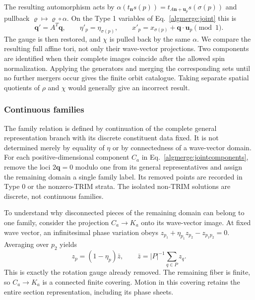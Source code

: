 The resulting automorphism acts by
$\alpha(t_{\bm n}s(p))=t_{A\bm n+\bm u_p}s(\sigma(p))$ and
pullback $\varrho\mapsto\varrho\circ\alpha$. On the Type 1
variables of Eq.~\eqref{algmerge:joint} this is
\begin{equation}
 \bm q'=A^T\bm q,\qquad
 \eta'_p=\eta_{\sigma(p)},\qquad
 x'_p=x_{\sigma(p)}+\bm q\cdot\bm u_p\pmod1.
 \tag{38e}\label{algmerge:pullback}
\end{equation}
The gauge is then restored, and $\chi$ is pulled back by the
same $\alpha$. We compare the resulting full affine tori,
not only their wave-vector projections. Two components are
identified when their complete images coincide after the
allowed spin normalization. Applying the generators and merging
the corresponding sets until no further mergers occur gives
the finite orbit catalogue. Taking separate spatial quotients
of $\rho$ and $\chi$ would generally give an incorrect result.

\subsubsection{Continuous families}
\label{algmerge:continuous}

The family relation is defined by continuation of the complete
general representation branch with its discrete constituent
data fixed. It is not determined merely by equality of $\eta$
or by connectedness of a wave-vector domain. For each
positive-dimensional component $C_a$ in
Eq.~\eqref{algmerge:jointcomponents}, remove the loci
$2\bm q=0$ modulo one from its general representatives and
assign the remaining domain a single family label. Its removed
points are recorded in Type 0 or the nonzero-TRIM strata.
The isolated non-TRIM solutions are discrete, not continuous
families.

To understand why disconnected pieces of the remaining domain
can belong to one family, consider the projection
$C_a\to K_a$ onto its wave-vector image. At fixed wave vector,
an infinitesimal phase variation obeys
$z_{p_1}+\eta_{p_1}z_{p_2}-z_{p_1p_2}=0$. Averaging over
$p_2$ yields
\begin{equation}
 z_p=(1-\eta_p)\bar z,\qquad
 \bar z=|P|^{-1}\sum_{q\in P}z_q.
 \tag{38f}\label{algmerge:phasefiber}
\end{equation}
This is exactly the rotation gauge already removed. The
remaining fiber is finite, so $C_a\to K_a$ is a connected
finite covering. Motion in this covering retains the entire
section representation, including its phase sheets.

